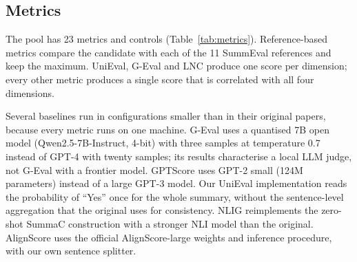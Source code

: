 \subsection{Metrics}

The pool has 23 metrics and controls (Table~\ref{tab:metrics}). Reference-based metrics compare the candidate with each of the 11 SummEval references and keep the maximum. UniEval, G-Eval and LNC produce one score per dimension; every other metric produces a single score that is correlated with all four dimensions.

Several baselines run in configurations smaller than in their original papers, because every metric runs on one machine. G-Eval uses a quantised 7B open model (Qwen2.5-7B-Instruct, 4-bit) with three samples at temperature 0.7 instead of GPT-4 with twenty samples; its results characterise a local LLM judge, not G-Eval with a frontier model. GPTScore uses GPT-2 small (124M parameters) instead of a large GPT-3 model. Our UniEval implementation reads the probability of ``Yes'' once for the whole summary, without the sentence-level aggregation that the original uses for consistency. NLIG reimplements the zero-shot SummaC construction with a stronger NLI model than the original. AlignScore uses the official AlignScore-large weights and inference procedure, with our own sentence splitter.


